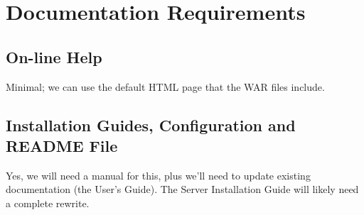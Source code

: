 \documentclass[justify]{dods-paper}
\begin{document}
\section{Documentation Requirements}

\subsection{On-line Help}

Minimal; we can use the default HTML page that the WAR files include.

\subsection{Installation Guides, Configuration and README File}

Yes, we will need a manual for this, plus we'll need to update existing documentation (the User's Guide). The Server Installation Guide will likely need a complete rewrite.
\end{document}
